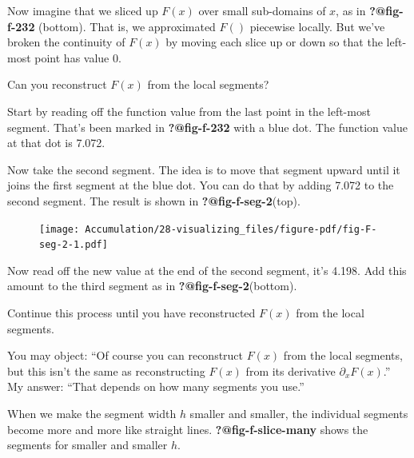 \documentclass[
  letterpaper,
  DIV=11,
  numbers=noendperiod,
  oneside]{scrreprt}
\begin{document}
Now imagine that we sliced up \(F(x)\) over small sub-domains of \(x\),
as in \textbf{?@fig-f-232} (bottom). That is, we approximated \(F()\)
piecewise locally. But we've broken the continuity of \(F(x)\) by moving
each slice up or down so that the left-most point has value 0.

Can you reconstruct \(F(x)\) from the local segments?

Start by reading off the function value from the last point in the
left-most segment. That's been marked in \textbf{?@fig-f-232} with a
blue dot. The function value at that dot is 7.072.

Now take the second segment. The idea is to move that segment upward
until it joins the first segment at the blue dot. You can do that by
adding 7.072 to the second segment. The result is shown in
\textbf{?@fig-f-seg-2}(top).

\begin{figure}


{\centering \texttt{[image: Accumulation/28-visualizing\_files/figure-pdf/fig-F-seg-2-1.pdf]}

}

\end{figure}

Now read off the new value at the end of the second segment, it's 4.198.
Add this amount to the third segment as in
\textbf{?@fig-f-seg-2}(bottom).

Continue this process until you have reconstructed \(F(x)\) from the
local segments.

You may object: ``Of course you can reconstruct \(F(x)\) from the local
segments, but this isn't the same as reconstructing \(F(x)\) from its
derivative \(\partial_x F(x)\).'' My answer: ``That depends on how many
segments you use.''

When we make the segment width \(h\) smaller and smaller, the individual
segments become more and more like straight lines.
\textbf{?@fig-f-slice-many} shows the segments for smaller and smaller
\(h\).
\end{document}
